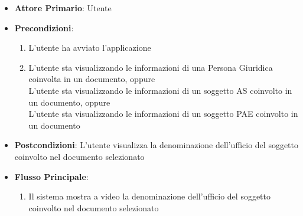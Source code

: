\begin{itemize}
    \item \textbf{Attore Primario}: Utente
    \item \textbf{Precondizioni}:
    \begin{enumerate}
        \item L'utente ha avviato l'applicazione
        \item L'utente sta visualizzando le informazioni di una Persona Giuridica coinvolta in un documento, oppure\\L'utente sta visualizzando le informazioni di un soggetto AS coinvolto in un documento, oppure\\L'utente sta visualizzando le informazioni di un soggetto PAE coinvolto in un documento
    \end{enumerate}
    \item \textbf{Postcondizioni}: L'utente visualizza la denominazione dell'ufficio del soggetto coinvolto nel documento selezionato
    \item \textbf{Flusso Principale}:
    \begin{enumerate}
        \item Il sistema mostra a video la denominazione dell'ufficio del soggetto coinvolto nel documento selezionato
    \end{enumerate}
\end{itemize}

